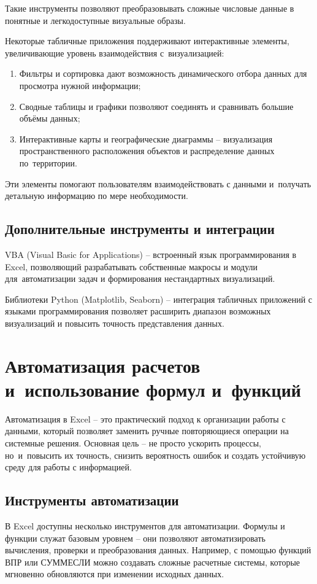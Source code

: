 \documentclass{ou}
\begin{document}
Такие инструменты позволяют преобразовывать сложные числовые данные в понятные и легкодоступные визуальные образы.

Некоторые табличные приложения поддерживают интерактивные элементы, увеличивающие уровень взаимодействия с~визуализацией:
\begin{enumerate}[leftmargin=0em, itemindent=3.75em, nosep, label=\arabic*)]
\item Фильтры и сортировка дают возможность динамического отбора данных для просмотра нужной информации;
\item Сводные таблицы и графики позволяют соединять и сравнивать большие объёмы данных;
\item Интерактивные карты и географические диаграммы -- визуализация пространственного расположения объектов и распределение данных по~территории.
\end{enumerate}

Эти элементы помогают пользователям взаимодействовать с данными и~получать детальную информацию по мере необходимости.
\subsection{Дополнительные инструменты и интеграции}
VBA (Visual Basic for Applications) -- встроенный язык программирования в Excel, позволяющий разрабатывать собственные макросы и модули для~автоматизации задач и формирования нестандартных визуализаций.

Библиотеки Python (Matplotlib, Seaborn) -- интеграция табличных приложений с языками программирования позволяет расширить диапазон возможных визуализаций и повысить точность представления данных.
\newpage
\section{Автоматизация расчетов и~использование формул и~функций}
Автоматизация в Excel -- это практический подход к организации работы с данными, который позволяет заменить ручные повторяющиеся операции на системные решения. Основная цель -- не просто ускорить процессы, но~и~повысить их точность, снизить вероятность ошибок и создать устойчивую среду для работы с информацией.
\subsection{Инструменты автоматизации}
В Excel доступны несколько инструментов для автоматизации. Формулы и функции служат базовым уровнем -- они позволяют автоматизировать вычисления, проверки и преобразования данных. Например, с помощью функций ВПР или СУММЕСЛИ можно создавать сложные расчетные системы, которые мгновенно обновляются при изменении исходных данных.
\end{document}
